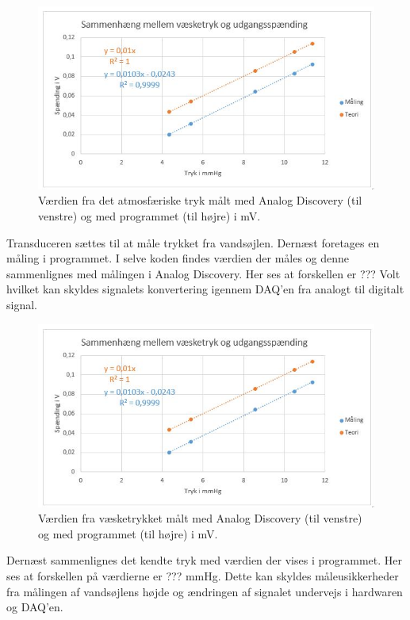 \begin{figure}[H]
	\centering
	\includegraphics{Figurer/Hardware/VaesketrykUdgangsspaending}
	\caption{Værdien fra det atmosfæriske tryk målt med Analog Discovery (til venstre) og med programmet (til højre) i mV.}
	\label{fig:Atmosfaerisktryk}
\end{figure}

Transduceren sættes til at måle trykket fra vandsøjlen. Dernæst foretages en måling i programmet. I selve koden findes værdien der måles og denne sammenlignes med målingen i Analog Discovery. Her ses at forskellen er ??? Volt hvilket kan skyldes signalets konvertering igennem DAQ’en fra analogt til digitalt signal.

\begin{figure}[H]
	\centering
	\includegraphics{Figurer/Hardware/VaesketrykUdgangsspaending}
	\caption{Værdien fra væsketrykket målt med Analog Discovery (til venstre) og med programmet (til højre) i mV.}
	\label{fig:Vaesketryk2}
\end{figure}

Dernæst sammenlignes det kendte tryk med værdien der vises i programmet. Her ses at forskellen på værdierne er ??? mmHg. Dette kan skyldes måleusikkerheder fra målingen af vandsøjlens højde og ændringen af signalet undervejs i hardwaren og DAQ’en.  

